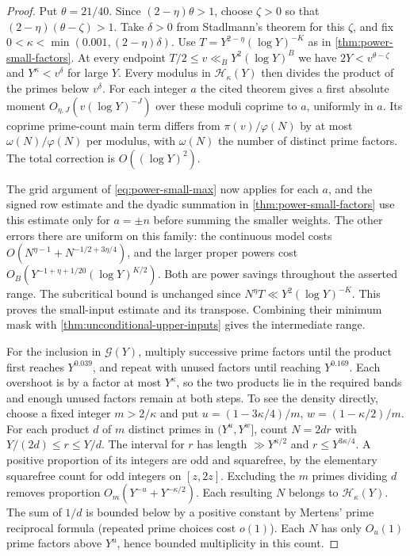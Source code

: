 \documentclass[11pt,a4paper]{article}
\numberwithin{equation}{section}
\begin{document}
\begin{proof}
Put $\theta=21/40$. Since $(2-\eta)\theta>1$, choose $\zeta>0$
so that $(2-\eta)(\theta-\zeta)>1$. Take $\delta>0$ from
Stadlmann's theorem \cite[Theorem~1]{Stadlmann} for this $\zeta$,
and fix $0<\kappa<\min(0.001,(2-\eta)\delta)$.
Use $T=Y^{2-\eta}(\log Y)^{-K}$ as in
\cref{thm:power-small-factors}. At every endpoint
$T/2\le v\ll_B Y^2(\log Y)^B$ we have
$2Y<v^{\theta-\zeta}$ and $Y^\kappa<v^\delta$ for large $Y$.
Every modulus in $\mathcal H_\kappa(Y)$ then divides the product
of the primes below $v^\delta$. For each integer $a$ the cited
theorem gives a first absolute moment $O_{\eta,J}(v(\log Y)^{-J})$
over these moduli coprime to $a$, uniformly in $a$.
Its coprime prime-count main term differs from $\pi(v)/\varphi(N)$
by at most $\omega(N)/\varphi(N)$ per modulus, with $\omega(N)$
the number of distinct prime factors. The total correction
is $O((\log Y)^2)$.

The grid argument of \cref{eq:power-small-max} now applies for
each $a$, and the signed row estimate and the dyadic summation
in \cref{thm:power-small-factors} use this estimate only for
$a=\pm n$ before summing the smaller weights. The other errors
there are uniform on this family: the continuous model costs
$O(N^{\eta-1}+N^{-1/2+3\eta/4})$, and the larger proper powers
cost $O_B(Y^{-1+\eta+1/20}(\log Y)^{K/2})$.
Both are power savings throughout the asserted range. The
subcritical bound is unchanged since $N^\eta T\ll Y^2(\log Y)^{-K}$.
This proves the small-input estimate and its transpose. Combining
their minimum mask with \cref{thm:unconditional-upper-inputs}
gives the intermediate range.

For the inclusion in $\mathcal G(Y)$, multiply successive prime
factors until the product first reaches $Y^{0.039}$, and repeat
with unused factors until reaching $Y^{0.169}$. Each overshoot
is by a factor at most $Y^\kappa$, so the two products lie in
the required bands and enough unused factors remain at both steps.
To see the density directly, choose a fixed integer $m>2/\kappa$
and put $u=(1-3\kappa/4)/m$, $w=(1-\kappa/2)/m$.
For each product $d$ of $m$ distinct primes in $(Y^u,Y^w]$,
count $N=2dr$ with $Y/(2d)\le r\le Y/d$. The interval for $r$
has length $\gg Y^{\kappa/2}$ and $r\le Y^{3\kappa/4}$.
A positive proportion of its integers are odd and squarefree,
by the elementary squarefree count for odd integers on $[z,2z]$.
Excluding the $m$ primes dividing $d$ removes proportion
$O_m(Y^{-u}+Y^{-\kappa/2})$. Each resulting $N$ belongs to
$\mathcal H_\kappa(Y)$. The sum of $1/d$ is bounded below by a
positive constant by Mertens' prime reciprocal formula (repeated
prime choices cost $o(1)$). Each $N$ has only $O_u(1)$ prime
factors above $Y^u$, hence bounded multiplicity in this count.
\end{proof}
\end{document}
